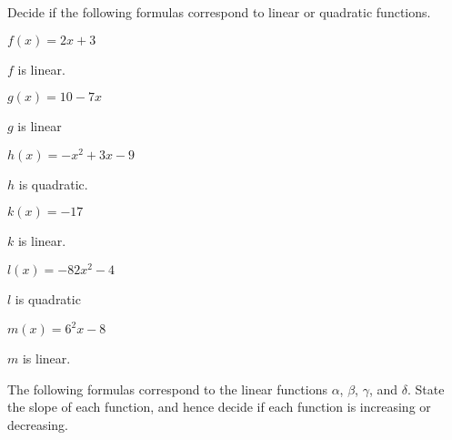 \begin{exercises}
\begin{problem}
Decide if the following formulas correspond to linear or 
quadratic functions.
\begin{multicols}{3}
	\begin{subproblem}
		$f(x)=2x+3$ 
		\begin{shortsolution}
			$f$ is linear. 
		\end{shortsolution}
	\end{subproblem}
	\begin{subproblem}
		$g(x)=10-7x$ 
		\begin{shortsolution}
			$g$ is linear 
		\end{shortsolution}
	\end{subproblem}
	\begin{subproblem}
		$h(x)=-x^2+3x-9$ 
		\begin{shortsolution}
			$h$ is quadratic. 
		\end{shortsolution}
	\end{subproblem}
	\begin{subproblem}
		$k(x)=-17$ 
		\begin{shortsolution}
			$k$ is linear.
		\end{shortsolution}
	\end{subproblem}
	\begin{subproblem}
		$l(x)=-82x^2-4$
		\begin{shortsolution}
			$l$ is quadratic 
		\end{shortsolution}
	\end{subproblem}
	\begin{subproblem}
		$m(x)=6^2x-8$ 
		\begin{shortsolution}
			$m$ is linear. 
		\end{shortsolution}
	\end{subproblem}
\end{multicols}
\end{problem}
\begin{problem}
The following formulas correspond to the linear functions $\alpha$, 
$\beta$, $\gamma$, and $\delta$. 
State the slope of each function, and hence decide if each function is increasing or decreasing.

\end{problem}
\end{exercises}
